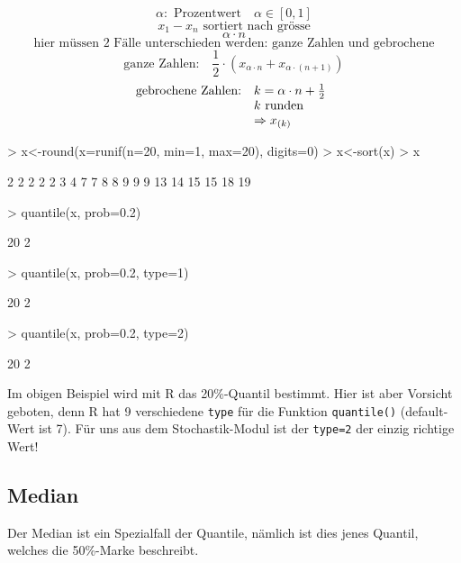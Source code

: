 \[ \alpha: \text{ Prozentwert} \quad \alpha \in [0,1] \]
\[ x_1 - x_n \text{ sortiert nach grösse}  \]
\[ \alpha \cdot n \]
\[ \text{hier müssen 2 Fälle unterschieden werden: ganze Zahlen und gebrochene} \]
\[ \text{ganze Zahlen:} \quad \frac{1}{2} 
\cdot (x_{\alpha \cdot n} + x_{\alpha \cdot (n+1)}) \]
\[ \begin{array}{@{}@{}ll}
	\text{gebrochene Zahlen:} & k=\alpha \cdot n + \frac{1}{2} \\
	                          & k \text{ runden} \\
				  & \Rightarrow x_{(k)}
\end{array}\]

\begin{Schunk}
\begin{Sinput}
> x<-round(x=runif(n=20, min=1, max=20), digits=0)
> x<-sort(x)
> x
\end{Sinput}
\begin{Soutput}
 [1]  2  2  2  2  2  3  4  7  7  8  8  9  9  9 13 14 15 15 18 19
\end{Soutput}
\begin{Sinput}
> quantile(x, prob=0.2)
\end{Sinput}
\begin{Soutput}
20%
  2 
\end{Soutput}
\begin{Sinput}
> quantile(x, prob=0.2, type=1)
\end{Sinput}
\begin{Soutput}
20%
  2 
\end{Soutput}
\begin{Sinput}
> quantile(x, prob=0.2, type=2)
\end{Sinput}
\begin{Soutput}
20%
  2 
\end{Soutput}
\end{Schunk}
Im obigen Beispiel wird mit R das 20\%-Quantil bestimmt. Hier ist aber 
Vorsicht geboten, denn R hat 9 verschiedene \verb!type! für die Funktion
\verb!quantile()! (default-Wert ist 7). Für uns aus dem 
Stochastik-Modul ist der \verb!type=2! 
der einzig richtige Wert!

\subsection{Median}
Der Median ist ein Spezialfall der Quantile, nämlich ist dies jenes Quantil,
welches die 50\%-Marke beschreibt.

